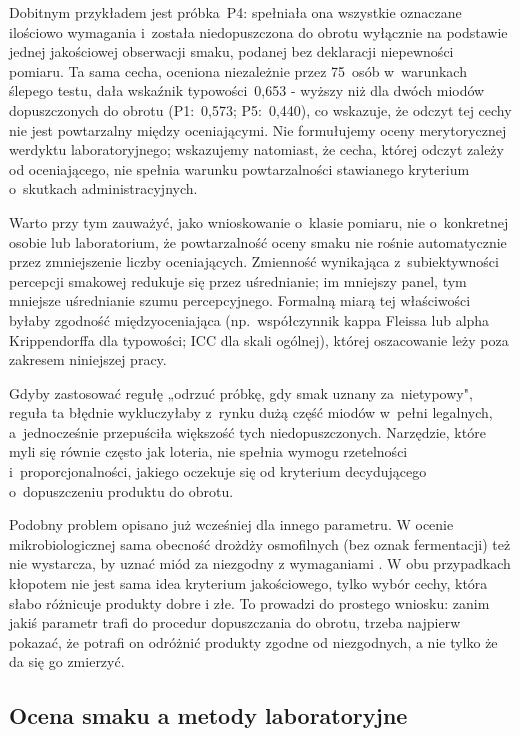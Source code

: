 \documentclass[12pt,a4paper]{article}
\begin{document}
Dobitnym przykładem jest próbka~P4: spełniała ona wszystkie oznaczane ilościowo
wymagania i~została niedopuszczona do obrotu wyłącznie na podstawie jednej
jakościowej obserwacji smaku, podanej bez deklaracji niepewności pomiaru.
Ta sama cecha, oceniona niezależnie przez 75~osób w~warunkach ślepego testu,
dała wskaźnik typowości~0{,}653 - wyższy niż dla dwóch miodów
dopuszczonych do obrotu (P1:~0{,}573; P5:~0{,}440), co wskazuje, że odczyt
tej cechy nie jest powtarzalny między oceniającymi. Nie formułujemy oceny
merytorycznej werdyktu laboratoryjnego; wskazujemy natomiast, że cecha, której
odczyt zależy od oceniającego, nie spełnia warunku powtarzalności stawianego
kryterium o~skutkach administracyjnych.

Warto przy tym zauważyć, jako wnioskowanie o~klasie pomiaru, nie o~konkretnej
osobie lub laboratorium, że powtarzalność oceny smaku nie rośnie automatycznie
przez zmniejszenie liczby oceniających. Zmienność wynikająca z~subiektywności
percepcji smakowej redukuje się przez uśrednianie; im mniejszy panel, tym mniejsze
uśrednianie szumu percepcyjnego. Formalną miarą tej właściwości byłaby zgodność
międzyoceniająca (np.\ współczynnik kappa Fleissa lub alpha Krippendorffa dla
typowości; ICC dla skali ogólnej), której oszacowanie leży poza zakresem
niniejszej pracy.

Gdyby zastosować regułę „odrzuć próbkę, gdy smak uznany za~nietypowy", reguła ta
błędnie wykluczyłaby z~rynku dużą część miodów w~pełni legalnych, a~jednocześnie
przepuściła większość tych niedopuszczonych. Narzędzie, które myli się równie
często jak loteria, nie spełnia wymogu rzetelności i~proporcjonalności, jakiego
oczekuje się od kryterium decydującego o~dopuszczeniu produktu do obrotu.

Podobny problem opisano już wcześniej dla innego parametru. W ocenie
mikrobiologicznej sama obecność drożdży osmofilnych (bez oznak fermentacji) też
nie wystarcza, by uznać miód za niezgodny z wymaganiami \cite{Gajda2026}. W obu
przypadkach kłopotem nie jest sama idea kryterium jakościowego, tylko wybór cechy,
która słabo różnicuje produkty dobre i złe. To prowadzi do prostego wniosku: zanim
jakiś parametr trafi do procedur dopuszczania do obrotu, trzeba najpierw pokazać,
że potrafi on odróżnić produkty zgodne od niezgodnych, a nie tylko że da się go
zmierzyć.

\subsection{Ocena smaku a metody laboratoryjne}
\end{document}
